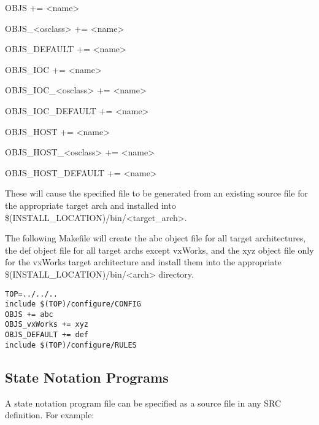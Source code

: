 \begin{description}\item {}OBJS += \textless{}name\textgreater{}

\item OBJS\_\textless{}osclass\textgreater{} += \textless{}name\textgreater{}

\item OBJS\_DEFAULT += \textless{}name\textgreater{}

\item {}OBJS\_IOC += \textless{}name\textgreater{}

\item OBJS\_IOC\_\textless{}osclass\textgreater{} += \textless{}name\textgreater{}

\item OBJS\_IOC\_DEFAULT += \textless{}name\textgreater{}

\item {}OBJS\_HOST += \textless{}name\textgreater{}

\item OBJS\_HOST\_\textless{}osclass\textgreater{} += \textless{}name\textgreater{}

\item OBJS\_HOST\_DEFAULT += \textless{}name\textgreater{}

\end{description}These will cause the specified file to be generated from an existing source file for the appropriate target arch and installed 
into \$(INSTALL\_LOCATION)/bin/\textless{}target\_arch\textgreater{}. 

The following Makefile will create the abc object file for all target architectures, the def object file for all target archs 
except vxWorks, and the xyz object file only for the vxWorks target architecture and install them into the appropriate 
\$(INSTALL\_LOCATION)/bin/\textless{}arch\textgreater{} directory.

\begin{verbatim}TOP=../../..
include $(TOP)/configure/CONFIG
OBJS += abc
OBJS_vxWorks += xyz
OBJS_DEFAULT += def
include $(TOP)/configure/RULES
\end{verbatim}\subsection{State Notation Programs}

A state notation program file can be specified as a source file in any SRC definition. For example:

